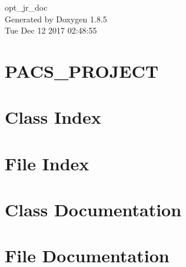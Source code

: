 \documentclass[twoside]{book}
\newcommand{\clearemptydoublepage}{%
  \newpage{\pagestyle{empty}\cleardoublepage}%
}
\begin{document}
\hypersetup{pageanchor=false}
\begin{titlepage}
\vspace*{7cm}
\begin{center}%
{\Large opt\-\_\-jr\-\_\-doc }\\
\vspace*{1cm}
{\large Generated by Doxygen 1.8.5}\\
\vspace*{0.5cm}
{\small Tue Dec 12 2017 02:48:55}\\
\end{center}
\end{titlepage}
\clearemptydoublepage
\tableofcontents
\clearemptydoublepage
{}
\hypersetup{pageanchor=true}

\chapter{P\-A\-C\-S\-\_\-\-P\-R\-O\-J\-E\-C\-T}
\label{md__vagrant_PROJECT_SPARK_PACS_PROJECT_README}
\hypertarget{md__vagrant_PROJECT_SPARK_PACS_PROJECT_README}{}

\chapter{Class Index}

\chapter{File Index}

\chapter{Class Documentation}








\chapter{File Documentation}





































\newpage
{}
{}
\printindex
\end{document}

